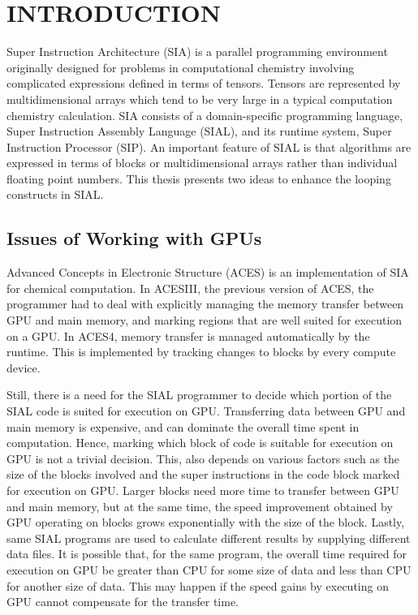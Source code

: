 \chapter{INTRODUCTION}\label{intro}
Super Instruction Architecture (SIA) is a parallel programming environment
originally designed for problems in computational chemistry involving complicated
expressions defined in terms of tensors. Tensors are represented by
multidimensional arrays which tend to be very large in a typical computation chemistry
calculation. SIA consists of a
domain-specific programming language, Super Instruction Assembly Language
(SIAL), and its runtime system, Super Instruction Processor (SIP). An important
feature of SIAL is that algorithms are expressed in terms of blocks or
multidimensional arrays rather than individual floating point numbers. This thesis
presents two ideas to enhance the looping constructs in SIAL.

\section{Issues of Working with GPUs}
Advanced Concepts in Electronic Structure (ACES) is an implementation of SIA for
chemical computation.
In ACESIII, the previous version of ACES, the programmer had to deal with explicitly managing
the memory transfer between GPU and main memory, and marking regions that are well suited for execution
on a GPU. In ACES4, memory transfer is managed automatically by the runtime.
This is implemented by tracking changes to blocks by every compute device.

Still, there is a need for the SIAL programmer to decide which portion of the SIAL code
is suited for execution on GPU. Transferring data between GPU and main memory is
expensive, and can dominate the overall time spent in computation. Hence, marking
which block of code is suitable for execution on GPU is not
a trivial decision. This, also depends on various factors such as
the size of the blocks involved and the super instructions in the code block marked
for execution on GPU.
Larger blocks need more time to transfer between GPU and main memory, but at the
same time, the speed improvement obtained by GPU operating on blocks grows
exponentially with the size of the block. Lastly, same SIAL programs are used to
calculate different results by supplying different data files. It is possible that,
for the same program, the overall time required for execution on GPU be greater
than CPU for some size of data and less than CPU for another size of data.
This may happen if the speed gains by executing on GPU cannot compensate for the
transfer time.

